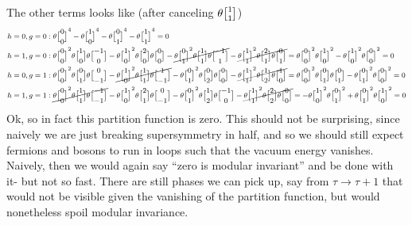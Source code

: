 \documentclass[11pt, class=article, crop=false]{standalone}
\begin{document}
\begin{enumerate}
	The other terms looks like (after canceling $\theta \twist11$)
	\[
	\footnotesize
	\begin{aligned}
		h=0, g=0:\;& \theta\twist00^4 - \theta\twist10^4 - \theta\twist01^4 - \theta\twist11^4 = 0\\
		h=1, g=0:\;& \theta \twist00^2 \theta\twist10 \theta \twist{-1}{0} - \theta \twist10^2 \theta \twist20 \theta \twist00 - \cancel{\theta \twist01^2 \theta \twist11 \theta \twist{-1}1} - \cancel{\theta \twist11^2 \theta \twist21 \theta \twist01} = \theta \twist00^2 \theta\twist10^2 - \theta \twist10^2 \theta \twist00^2 = 0 \\
		h=0, g=1:\;& \theta \twist00^2 \theta\twist01 \theta \twist0{-1} - \cancel{\theta \twist10^2 \theta \twist11 \theta \twist1{-1}} - \theta \twist01^2 \theta\twist02 \theta \twist00 - \cancel{\theta\twist11^2 \theta\twist12 \theta\twist10} = \theta \twist00^2 \theta\twist01 \theta \twist01 -   \theta \twist01^2 \theta \twist00^2  = 0 \\
		h=1, g=1:\;& \cancel{\theta \twist00^2 \theta\twist11 \theta \twist{-1}{-1}} - \theta \twist10^2 \theta \twist21 \theta \twist0{-1} - \theta \twist01^2 \theta \twist12 \theta \twist{-1}0 - \cancel{\theta \twist11^2 \theta\twist22 \theta\twist00} = - \theta\twist10^2 \theta\twist01^2 + \theta\twist01^2 \theta\twist10^2 = 0
	\end{aligned}
	\]
	Ok, so in fact this partition function is zero. This should not be surprising, since naively we are just breaking supersymmetry in half, and so we should still expect fermions and bosons to run in loops such that the vacuum energy vanishes. Naively, then we would again say ``zero is modular invariant'' and be done with it- but not so fast. There are still phases we can pick up, say from  $\tau \to \tau + 1$ that would not be visible given the vanishing of the partition function, but would nonetheless spoil modular invariance. 
	

\end{enumerate}
\end{document}
